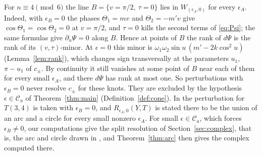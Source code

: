 \begin{remark}\label{rem:epsB}
For $n\equiv4\pmod6$ the line $B=\{v=\pi/2,\ \tau=0\}$ lies in $W_{(\epsilon_A,0)}$ for every $\epsilon_A$. Indeed, with
$\epsilon_B=0$ the phases $\Theta_1=mv$ and $\Theta_2=-m'v$ give $\cos\Theta_1=\cos\Theta_2=0$ at $v=\pi/2$, and $\tau=0$ kills the
second terms of \eqref{eq:Psi}; the same formulas give $\partial_u\Psi=0$ along $B$. Hence at points of $B$ the rank of
$d\Psi$ is the rank of its $(v,\tau)$-minor. At $\epsilon=0$ this minor is $\omega_1\omega_2\sin u\,(m'-2k\cos^2u)$ (Lemma~\ref{lem:rank}),
which changes sign transversally at the parameters $u_1$, $\pi-u_1$ of $c_\pm$. By continuity it still vanishes at
some point of $B$ near each of them for every small $\epsilon_A$, and there $d\Psi$ has rank at most one. So perturbations
with $\epsilon_B=0$ never resolve $c_\pm$ for these knots. They are excluded by the hypothesis $\epsilon\in\mathcal C_a$
of Theorem~\ref{thm:main} (Definition~\ref{def:cone}). In \cite[\S11.6]{HHK2} the perturbation for $T(3,4)$ is taken with $\epsilon_B=0$, and
$R_{\epsilon_A,0}(Y,T)$ is stated there to be the union of an arc and a circle for every small nonzero $\epsilon_A$. For small
$\epsilon\in\mathcal C_a$, which forces $\epsilon_B\neq0$, our computations give the split resolution of Section~\ref{sec:complex},
that is, the arc and circle drawn in \cite[Figs.~20--21]{HHK2}, and Theorem~\ref{thm:arc} then gives the complex computed
there.
\end{remark}

